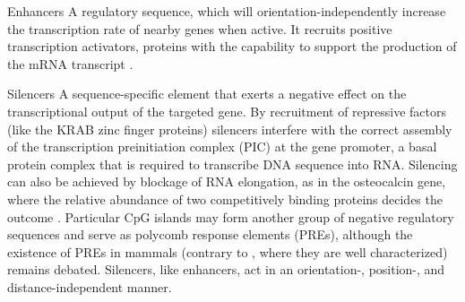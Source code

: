\begin{mydescription}{0.5cm}
	\item[Enhancers] A regulatory sequence, which will orientation-independently increase the transcription rate of nearby genes when active\cite{Marsman2012,Gibcus2013}. It recruits positive transcription activators, proteins with the capability to support the production of the mRNA transcript .
	
	\item[Silencers] A sequence-specific element that exerts a negative effect on the transcriptional output of the targeted gene. By recruitment of repressive factors (like the KRAB zinc finger proteins\cite{Witzgall1994,Urrutia2003}) silencers interfere with the correct assembly of the transcription preinitiation complex (PIC) at the gene promoter\cite{Ogbourne1998}, a basal protein complex that is required to transcribe DNA sequence into RNA. Silencing can also be achieved by blockage of RNA elongation, as in the osteocalcin gene, where the relative abundance of two competitively binding proteins decides the outcome \cite{Frenkel1994,Li1995}. Particular CpG islands may form another group of negative regulatory sequences and serve as polycomb response elements (PREs), although the existence of PREs in mammals (contrary to , where they are well characterized) remains debated\cite{Kassis2013,Bauer2016,Rickels2017}. Silencers, like enhancers, act in an orientation-, position-, and distance-independent manner.
	

\end{mydescription}
